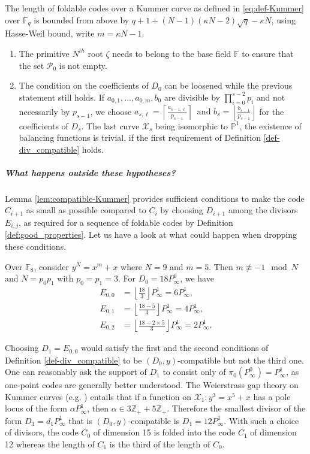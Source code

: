 \documentclass[a4paper,USenglish,autoref]{lipics-v2021}
\newcommand\F{\mathbb{F}}
\newcommand\PP{\mathbb{P}}
\newcommand\Z{\mathbb{Z}}
\newcommand\floor[1]{\left\lfloor #1 \right\rfloor}
\newcommand\ceil[1]{\left\lceil #1 \right\rceil}
\newcommand\calX{\mathcal{X}}
\newcommand\calP{\mathcal{P}}
\begin{document}
The length of foldable codes over a Kummer curve as defined in \eqref{eq:def-Kummer} over $\F_q$ is bounded from above by $q+1+(N-1)(\kappa N-2)\sqrt{q}-\kappa N$, using Hasse-Weil bound, write $m=\kappa N-1$.

\begin{remark}
	\begin{enumerate}
		\item The primitive $N^{th}$ root $\zeta$ needs to belong to the base field $\F$ to ensure that the set $\calP_0$ is not empty.
		\item The condition on the coefficients of $D_0$ can be loosened while the previous statement still holds. If  $a_{0,1},\dots,a_{0,m},b_{0}$ are divisible by $\prod_{i=0}^{s-2} p_i$ and not necessarily by $p_{s-1}$, we choose $a_{s,\ell}=\ceil{\frac{a_{s-1,\ell}}{p_{s-1}}}\ \text{ and } b_{s}=\floor{\frac{b_{s-1}}{p_{s-1}}}$ for the coefficients of $D_s$. The last curve $\calX_s$ being isomorphic to $\PP^1$, the existence of balancing functions is trivial, if the first requirement of Definition \ref{def-div_compatible} holds.
	\end{enumerate} 
\end{remark}



\subparagraph*{What happens outside these hypotheses?}
Lemma \ref{lem:compatible-Kummer} provides sufficient conditions to make the code $C_{i+1}$ as small as possible compared to $C_i$ by choosing $D_{i+1}$ among the divisors $E_{i,j}$, as required for a sequence of foldable codes by Definition \ref{def:good_properties}. Let us have a look at what could happen when dropping these conditions.

\begin{example}\label{ex:bad_kummer}
	Over $\F_8$, consider $y^N=x^m+x$ where $N=9$ and $m=5$. Then $m \not\equiv -1 \mod N$ and $N=p_0p_1$ with $p_0=p_1=3$. For $D_0=18 P_\infty^0$, we have
	\begin{align*}
	E_{0,0}&=\floor{\frac{18}{3}}P_\infty^1=6 P_\infty^1, \\
	E_{0,1}&=\floor{\frac{18-5}{3}} P_\infty^1=4 P_\infty^1, \\ 
	E_{0,2}&=\floor{\frac{18-2 \times 5}{3}} P_\infty^1=2 P_\infty^1.
    \end{align*}
	
	Choosing $D_1=E_{0,0}$ would satisfy the first and the second conditions of Definition \ref{def-div_compatible} to be $(D_0,y)$-compatible but not the third one. One can reasonably ask the support of $D_1$ to consist only of $\pi_0(P_\infty^0)=P_\infty^1$, as one-point codes are generally better understood. The Weierstrass gap theory on Kummer curves (e.g. \cite[Theorem~3.2]{MQS15}) entails that if a function on $\calX_1 : y^3=x^5+x$ has a pole locus of the form $\alpha P_\infty^1$, then $\alpha \in 3\Z_++5\Z_+$. Therefore the smallest divisor of the form $D_1=d_1P_\infty^1$ that is $(D_0,y)$-compatible is $D_1=12 P_\infty^1$. With such a choice of divisors, the code $C_0$ of dimension 15 is folded into the code $C_1$ of dimension 12 whereas the length of $C_1$ is the third of the length of $C_0$.
	
\end{example}
\end{document}
